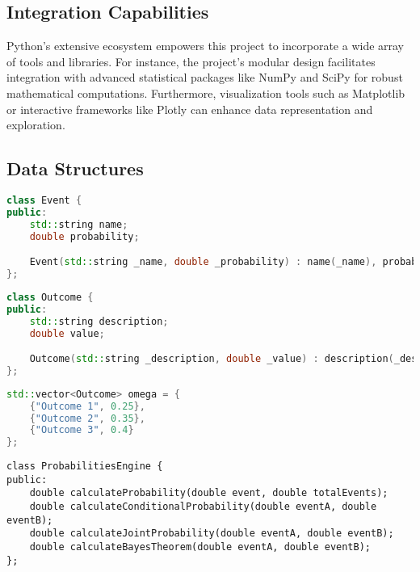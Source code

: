 


    \subsection*{Integration Capabilities}

Python's extensive ecosystem empowers this project to incorporate a wide array of tools and libraries. For instance, the project's modular design facilitates integration with advanced statistical packages like NumPy and SciPy for robust mathematical computations. Furthermore, visualization tools such as Matplotlib or interactive frameworks like Plotly can enhance data representation and exploration.







\subsection*{Data Structures}

\begin{lstlisting}[language=C++, caption={Event Class Declaration}]
class Event {
public:
    std::string name;
    double probability;

    Event(std::string _name, double _probability) : name(_name), probability(_probability) {}
};
\end{lstlisting}

\begin{lstlisting}[language=C++, caption={Outcome Class Declaration}]
class Outcome {
public:
    std::string description;
    double value;

    Outcome(std::string _description, double _value) : description(_description), value(_value) {}
};
\end{lstlisting}

\begin{lstlisting}[language=C++, caption={Omega (Set of All Possible Outcomes)}]
std::vector<Outcome> omega = {
    {"Outcome 1", 0.25},
    {"Outcome 2", 0.35},
    {"Outcome 3", 0.4}
};
\end{lstlisting}

\begin{lstlisting}[caption={Probabilities Engine Declaration}]
class ProbabilitiesEngine {
public:
    double calculateProbability(double event, double totalEvents);
    double calculateConditionalProbability(double eventA, double eventB);
    double calculateJointProbability(double eventA, double eventB);
    double calculateBayesTheorem(double eventA, double eventB);
};
\end{lstlisting}




